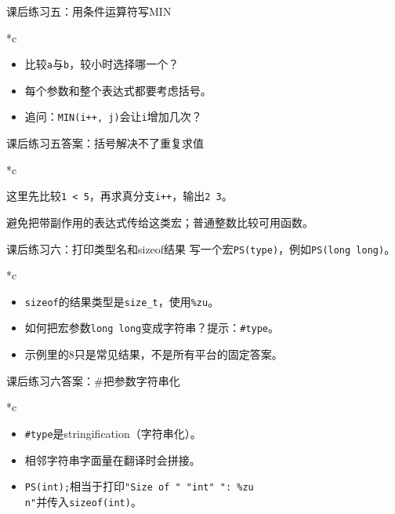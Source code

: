 \begin{frame}{课后练习五：用条件运算符写MIN}
\begin{Code}*{c}\end{Code}\begin{itemize}
\item 比较\texttt{a}与\texttt{b}，较小时选择哪一个？
\item 每个参数和整个表达式都要考虑括号。
\item 追问：\texttt{MIN(i++, j)}会让\texttt{i}增加几次？
\end{itemize}

\end{frame}

\begin{frame}{课后练习五答案：括号解决不了重复求值}
\begin{Code}*{c}\end{Code}这里先比较\texttt{1 < 5}，再求真分支\texttt{i++}，输出\texttt{2 3}。\par\alert{避免把带副作用的表达式传给这类宏；普通整数比较可用函数。}
\end{frame}

\begin{frame}{课后练习六：打印类型名和sizeof结果}
写一个宏\texttt{PS(type)}，例如\texttt{PS(long long)}。\begin{Code}*{c}\end{Code}\begin{itemize}
\item \texttt{sizeof}的结果类型是\texttt{size\_t}，使用\texttt{\%zu}。
\item 如何把宏参数\texttt{long long}变成字符串？提示：\texttt{\#type}。
\item \alert{示例里的8只是常见结果，不是所有平台的固定答案。}
\end{itemize}

\end{frame}

\begin{frame}{课后练习六答案：\#把参数字符串化}
\begin{Code}*{c}\end{Code}\begin{itemize}
\item \texttt{\#type}是stringification（字符串化）。
\item 相邻字符串字面量在翻译时会拼接。
\item \texttt{PS(int);}相当于打印\texttt{"Size of " "int" ": \%zu\\n"}并传入\texttt{sizeof(int)}。
\end{itemize}

\end{frame}

